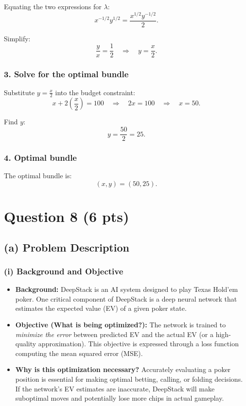 \documentclass[12pt]{article}
\begin{document}
Equating the two expressions for \(\lambda\):
\[
x^{-1/2}y^{1/2} = \frac{x^{1/2}y^{-1/2}}{2}.
\]

Simplify:
\[
\frac{y}{x} = \frac{1}{2} \quad \Rightarrow \quad y = \frac{x}{2}.
\]

\subsubsection*{3. Solve for the optimal bundle}
Substitute \(y = \frac{x}{2}\) into the budget constraint:
\[
x + 2\left(\frac{x}{2}\right) = 100 \quad \Rightarrow \quad 2x = 100 \quad \Rightarrow \quad x = 50.
\]

Find \(y\):
\[
y = \frac{50}{2} = 25.
\]

\subsubsection*{4. Optimal bundle}
The optimal bundle is:
\[
(x, y) = (50, 25).
\]
\newpage
\section*{Question 8 (6 pts)}

\subsection*{(a) Problem Description}

\subsubsection*{(i) Background and Objective}

\begin{itemize}
    \item \textbf{Background:} 
    DeepStack is an AI system designed to play Texas Hold’em poker. One critical component of DeepStack is a deep neural network that estimates the expected value (EV) of a given poker state.
    
    \item \textbf{Objective (What is being optimized?):} 
    The network is trained to \emph{minimize the error} between predicted EV and the actual EV (or a high-quality approximation). This objective is expressed through a loss function computing the mean squared error (MSE).
    
    \item \textbf{Why is this optimization necessary?} 
    Accurately evaluating a poker position is essential for making optimal betting, calling, or folding decisions. If the network’s EV estimates are inaccurate, DeepStack will make suboptimal moves and potentially lose more chips in actual gameplay.
\end{itemize}
\end{document}
